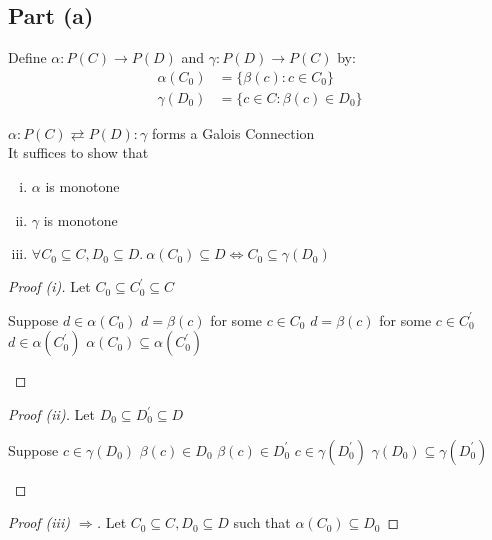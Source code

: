 \subsection{Part (a)}\label{sec:q-2-a}
Define $\alpha : P(C)\to P(D)$ and $\gamma : P(D)\to P(C)$ by:
\begin{align*}
  \alpha(C_0) & = \{\beta(c) : c\in C_0\} \\
  \gamma(D_0) & = \{c\in C : \beta(c)\in D_0\}
\end{align*}

\begin{prop}
  $\alpha : P(C)\rightleftarrows P(D) : \gamma$ forms a Galois Connection\\
  It suffices to show that
  \begin{enumerate}[(i)]
    \item $\alpha$ is monotone
    \item $\gamma$ is monotone
    \item $\forall C_0\subseteq C,D_0\subseteq D.~\alpha(C_0)\subseteq D\iff C_0\subseteq\gamma(D_0)$
  \end{enumerate}
  \begin{proof}[Proof (i)]
    Let $C_0\subseteq C_0^\prime\subseteq C$
    \begin{itemize}
      \step Suppose $d\in\alpha(C_0)$
      \step[\imps] $d = \beta(c)$ for some $c\in C_0$
      \step[\imps] $d = \beta(c)$ for some $c\in C_0^\prime$
      \step[\imps] $d\in\alpha(C_0^\prime)$
      \step[\imps] $\alpha(C_0)\subseteq\alpha(C_0^\prime)$\qedhere
    \end{itemize}
  \end{proof}
  \begin{proof}[Proof (ii)]
    Let $D_0\subseteq D_0^\prime\subseteq D$
    \begin{itemize}
      \step Suppose $c\in\gamma(D_0)$
      \step[\imps] $\beta(c) \in D_0$
      \step[\imps] $\beta(c) \in D_0^\prime$
      \step[\imps] $c\in\gamma(D_0^\prime)$
      \step[\imps] $\gamma(D_0)\subseteq\gamma(D_0^\prime)$\qedhere
    \end{itemize}
  \end{proof}
  \begin{proof}[Proof (iii) $\Rightarrow$]
    Let $C_0\subseteq C, D_0\subseteq D$ such that $\alpha(C_0)\subseteq D_0$

\end{proof}
\end{prop}
